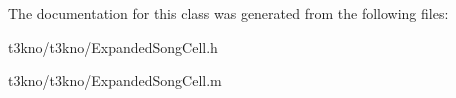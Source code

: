 The documentation for this class was generated from the following files\-:\begin{DoxyCompactItemize}
\item 
t3kno/t3kno/Expanded\-Song\-Cell.\-h\item 
t3kno/t3kno/Expanded\-Song\-Cell.\-m\end{DoxyCompactItemize}
